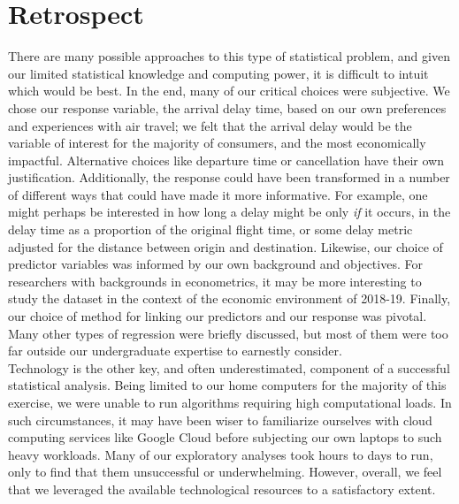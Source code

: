 \documentclass[12pt, a4paper, openany]{book}
\newcommand\tab[1][1cm]{\hspace*{#1}}
\begin{document}
	\section{Retrospect}
	\tab There are many possible approaches to this type of statistical problem, and given our limited statistical knowledge and computing power, it is difficult to intuit which would be best. In the end, many of our critical choices were subjective. We chose our response variable, the arrival delay time, based on our own preferences and experiences with air travel; we felt that the arrival delay would be the variable of interest for the majority of consumers, and the most economically impactful. Alternative choices like departure time or cancellation have their own justification. Additionally, the response could have been transformed in a number of different ways that could have made it more informative. For example, one might perhaps be interested in how long a delay might be only \textit{if} it occurs, in the delay time as a proportion of the original flight time, or some delay metric adjusted for the distance between origin and destination. Likewise, our choice of predictor variables was informed by our own background and objectives. For researchers with backgrounds in econometrics, it may be more interesting to study the dataset in the context of the economic environment of 2018-19. Finally, our choice of method for linking our predictors and our response was pivotal. Many other types of regression were briefly discussed, but most of them were too far outside our undergraduate expertise to earnestly consider.  \\
	\tab  Technology is the other key, and often underestimated, component of a successful statistical analysis. Being limited to our home computers for the majority of this exercise, we were unable to run algorithms requiring high computational loads. In such circumstances, it may have been wiser to familiarize ourselves with cloud computing services like Google Cloud before subjecting our own laptops to such heavy workloads. Many of our exploratory analyses took hours to days to run, only to find that them unsuccessful or underwhelming. However, overall, we feel that we leveraged the available technological resources to a satisfactory extent. 
\end{document}
